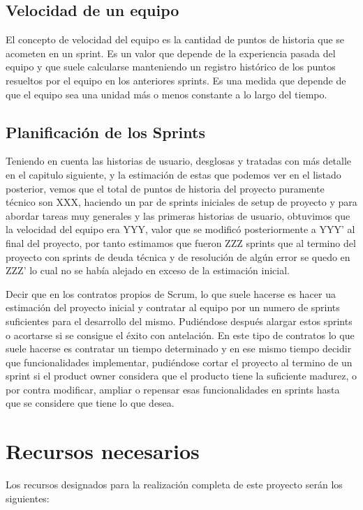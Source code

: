 \documentclass[../pfc.tex]{subfiles}
\begin{document}
	\subsection{Velocidad de un equipo}
	
	El concepto de velocidad del equipo es la cantidad de puntos de historia que se acometen en un sprint. Es un valor que depende de la experiencia pasada del equipo y que suele calcularse manteniendo un registro histórico de los puntos resueltos por el equipo en los anteriores sprints. Es una medida que depende de que el equipo sea una unidad más o menos constante a lo largo del tiempo. 
	
	\subsection{Planificación de los Sprints}   
	
	Teniendo en cuenta las historias de usuario, desglosas y tratadas con más detalle en el capitulo siguiente, y la estimación de estas que podemos ver en el listado posterior, vemos que el total de puntos de historia del proyecto puramente técnico son XXX, haciendo un par de sprints iniciales de setup de proyecto y para abordar tareas muy generales y las primeras historias de usuario, obtuvimos que la velocidad del equipo era YYY, valor que se modificó posteriormente a YYY' al final del proyecto, por tanto estimamos que fueron ZZZ sprints que al termino del proyecto con sprints de deuda técnica y de resolución de algún error se quedo en ZZZ' lo cual no se había alejado en exceso de la estimación inicial. 
	
	Decir que en los contratos propios de Scrum, lo que suele hacerse es hacer ua estimación del proyecto inicial y contratar al equipo por un numero de sprints suficientes para el desarrollo del mismo. Pudiéndose después alargar estos sprints o acortarse si se consigue el éxito con antelación. En este tipo de contratos lo que suele hacerse es contratar un tiempo determinado y en ese mismo tiempo decidir que funcionalidades implementar, pudiéndose cortar el proyecto al termino de un sprint si el product owner considera que el producto tiene la suficiente madurez, o por contra modificar, ampliar o repensar esas funcionalidades en sprints hasta que se considere que tiene lo que desea. 
	
	
	\section{Recursos necesarios}
	Los recursos designados para la realización completa de este proyecto serán los siguientes:\\
	
\end{document}
